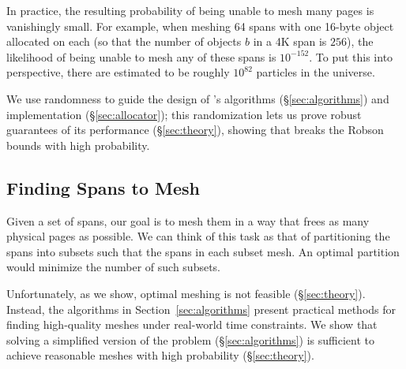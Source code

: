 In practice, the resulting probability of being unable to mesh many
pages is vanishingly small. For example, when meshing 64 spans with
one 16-byte object allocated on each (so that the number of objects
$b$ in a 4K span is $256$), the likelihood of being unable to mesh any
of these spans is $10^{-152}$. To put this into perspective, there are
estimated to be roughly $10^{82}$ particles in the universe.

We use randomness to guide the design of \Mesh{}'s algorithms
(\S\ref{sec:algorithms}) and implementation (\S\ref{sec:allocator});
this randomization lets us prove robust guarantees of its performance
(\S\ref{sec:theory}), showing that \Mesh{} breaks the Robson bounds with
high probability.




\subsection{Finding Spans to Mesh}

Given a set of spans, our goal is to mesh them in a way that frees as
many physical pages as possible. We can think of this task as that of
partitioning the spans into subsets such that the spans in each subset
mesh. An optimal partition would minimize the number of such subsets.


Unfortunately, as we show, optimal meshing is not feasible
(\S\ref{sec:theory}). Instead, the algorithms in
Section~\ref{sec:algorithms} present practical methods for finding
high-quality meshes under real-world time constraints. We show that
solving a simplified version of the problem (\S\ref{sec:algorithms})
is sufficient to achieve reasonable meshes with high probability
(\S\ref{sec:theory}).

